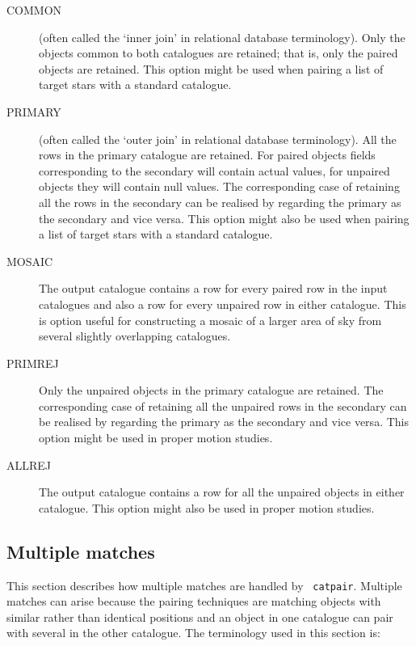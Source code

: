 \documentclass[twoside,11pt]{article}
\renewcommand{\_}{\texttt{\symbol{95}}}
\begin{document}
\begin{description}

  \item[COMMON] (often called the `inner join' in relational database
   terminology). Only the objects common to both catalogues are retained;
   that is, only the paired objects are retained. This option might be
   used when pairing a list of target stars with a standard catalogue.

  \item[PRIMARY] (often called the `outer join' in relational database
   terminology). All the rows in the primary catalogue are retained.
   For paired objects fields corresponding to the secondary will contain
   actual values, for unpaired objects they will contain null values.
   The corresponding case of retaining all the rows in the secondary
   can be realised by regarding the primary as the secondary and vice
   versa. This option might also be used when pairing a list of target
   stars with a standard catalogue.

  \item[MOSAIC] The output catalogue contains a row for every paired row
   in the input catalogues and also a row for every unpaired row in
   either catalogue. This is option useful for constructing a mosaic of a
   larger area of sky from several slightly overlapping catalogues.

  \item[PRIMREJ] Only the unpaired objects in the primary catalogue are
   retained.    The corresponding case of retaining all the unpaired rows in
   the secondary can be realised by regarding the primary as the secondary
   and vice versa. This option might be used in proper motion studies.

  \item[ALLREJ] The output catalogue contains a row for all the unpaired
   objects in either catalogue. This option might also be used in proper
   motion studies.

\end{description}


\subsection{\label{PAIR_MULTIPLE}Multiple matches}

This section describes how multiple matches are handled by {\tt
catpair}. Multiple matches can arise because the pairing techniques are
matching objects with similar rather than identical positions and
an object in one catalogue can pair with several in the other catalogue.
The terminology used in this section is:
\end{document}
